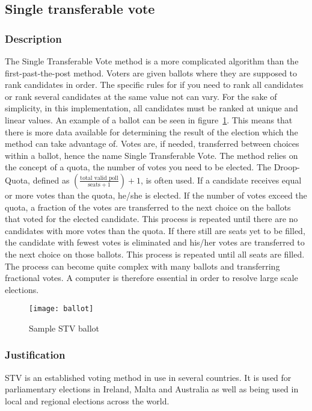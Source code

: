 \documentclass[12pt]{article}
\begin{document}
\subsection{Single transferable vote}
\subsubsection{Description}
The Single Transferable Vote method is a more complicated algorithm than the first-past-the-post method. Voters are given ballots where they are supposed to rank candidates in order. The specific rules for if you need to rank all candidates or rank several candidates at the same value not can vary. For the sake of simplicity, in this implementation, all candidates must be ranked at unique and linear values. An example of a ballot can be seen in figure~\ref{fig:stv ballot}.	This means that there is more data available for determining the result of the election which the method can take advantage of. Votes are, if needed, transferred between choices within a ballot, hence the name Single Transferable Vote. The method relies on the concept of a quota, the number of votes you need to be elected. The Droop-Quota, defined as $(\frac{\text{total valid poll}}{\text{seats} + 1})+1$, is often used. If a candidate receives equal or more votes than the quota, he/she is elected. If the number of votes exceed the quota, a fraction of the votes are transferred to the next choice on the ballots that voted for the elected candidate. This process is repeated until there are no candidates with more votes than the quota. If there still are seats yet to be filled, the candidate with fewest votes is eliminated and his/her votes are transferred to the next choice on those ballots. This process is repeated until all seats are filled. The process can become quite complex with many ballots and transferring fractional votes. A computer is therefore essential in order to resolve large scale elections.
\begin{figure}
	\centering
	\texttt{[image: ballot]}
	\caption{Sample STV ballot}
\label{fig:stv ballot}
\end{figure}
\subsubsection{Justification}
STV is an established voting method in use in several countries. It is used for parliamentary elections in Ireland, Malta and Australia as well as being used in local and regional elections across the world.
\end{document}

